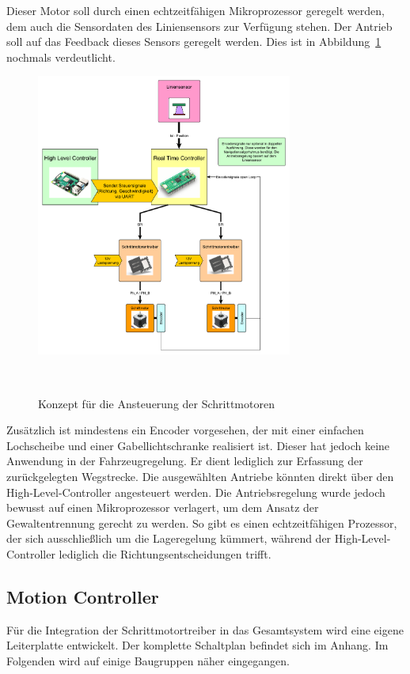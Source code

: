 \documentclass[main.  tex]{subfiles} %
\begin{document}
Dieser Motor soll durch einen echtzeitfähigen Mikroprozessor geregelt werden,
dem auch die Sensordaten des Liniensensors zur Verfügung stehen. Der Antrieb
soll auf das Feedback dieses Sensors geregelt werden. Dies ist in
Abbildung~\ref{fig:RTC_Trinamic_Konzept} nochmals verdeutlicht.
\begin{figure}[h!]
    \centering
    \includegraphics[width=0.75\textwidth]{./fig_Antriebe/Konzept_RTC_Trinamic.pdf}
    \caption{Konzept für die Ansteuerung der Schrittmotoren}~\label{fig:RTC_Trinamic_Konzept}
\end{figure}

Zusätzlich ist mindestens ein Encoder vorgesehen, der mit einer einfachen
Lochscheibe und einer Gabellichtschranke realisiert ist. Dieser hat jedoch
keine Anwendung in der Fahrzeugregelung. Er dient lediglich zur Erfassung der
zurückgelegten Wegstrecke. Die ausgewählten Antriebe könnten direkt über den
High-Level-Controller angesteuert werden. Die Antriebsregelung wurde jedoch
bewusst auf einen Mikroprozessor verlagert, um dem Ansatz der Gewaltentrennung
gerecht zu werden. So gibt es einen echtzeitfähigen Prozessor, der sich
ausschließlich um die Lageregelung kümmert, während der High-Level-Controller
lediglich die Richtungsentscheidungen trifft.

\subsection*{Motion Controller} %

Für die Integration der Schrittmotortreiber in das Gesamtsystem wird eine
eigene Leiterplatte entwickelt. Der komplette Schaltplan befindet sich im
Anhang. Im Folgenden wird auf einige Baugruppen näher eingegangen.
\end{document}
